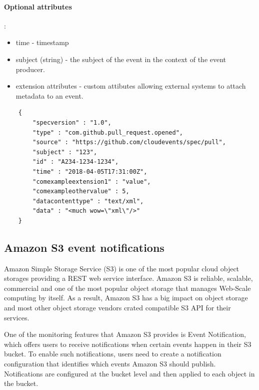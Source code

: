     \paragraph{Optional attributes}:
    \begin{itemize}
        \item time - timestamp
        \item subject (string) - the subject of the event in the context of the event producer.
        \item extension attributes - custom attibutes allowing external systems to attach metadata to an event.
    \end{itemize}


    \begin{lstlisting}
    {
        "specversion" : "1.0",
        "type" : "com.github.pull_request.opened",
        "source" : "https://github.com/cloudevents/spec/pull",
        "subject" : "123",
        "id" : "A234-1234-1234",
        "time" : "2018-04-05T17:31:00Z",
        "comexampleextension1" : "value",
        "comexampleothervalue" : 5,
        "datacontenttype" : "text/xml",
        "data" : "<much wow=\"xml\"/>"
    }
    \end{lstlisting}

    \subsection{Amazon S3 event notifications}
    Amazon Simple Storage Service (S3) is one of the most popular cloud object storages providing a REST web service interface. Amazon S3 is reliable, scalable, commercial and one of the most popular object storage that manages Web-Scale computing by itself\cite{eventS3}. As a result, Amazon S3 has a big impact on object storage and most other object storage vendors crated compatible S3 API for their services.

    One of the monitoring features that Amazon S3 provides is Event Notification, which offers users to receive notifications when certain events happen in their S3 bucket. To enable such notifications, users need to create a notification configuration that identifies which events Amazon S3 should publish\cite{eventS3EventNotification}. Notifications are configured at the bucket level and then applied to each object in the bucket.

